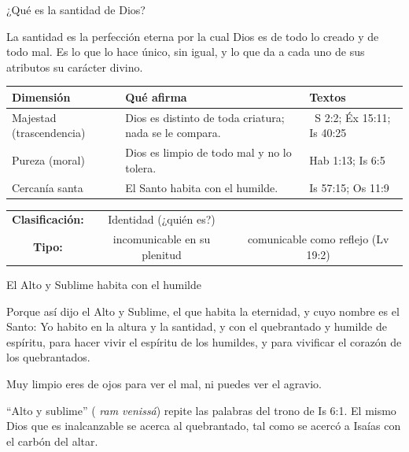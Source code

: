 \begin{frame}{¿Qué es la santidad de Dios?}
\begin{tcolorbox}[colback=papiro,colframe=azul,boxrule=1pt,arc=3pt,fonttitle=\bfseries\small,title=Definición]
\small La santidad es la perfección eterna por la cual Dios es  de todo lo creado y  de todo mal. Es lo que lo hace único, sin igual, y lo que da a cada uno de sus atributos su carácter divino.
\end{tcolorbox}
\scriptsize\renewcommand{\arraystretch}{1.25}
\begin{tabular}{@{}>{\RaggedRight\arraybackslash}p{2.6cm}>{\RaggedRight\arraybackslash}p{5.0cm}>{\RaggedRight\arraybackslash}p{4.0cm}@{}}
\toprule
\textbf{Dimensión} & \textbf{Qué afirma} & \textbf{Textos} \\ \midrule
Majestad (trascendencia) & Dios es distinto de toda criatura; nada se le compara. & 1~S 2:2; Éx 15:11; Is 40:25 \\
Pureza (moral) & Dios es limpio de todo mal y no lo tolera. & Hab 1:13; Is 6:5 \\
Cercanía santa & El Santo habita con el humilde. & Is 57:15; Os 11:9 \\
\bottomrule
\end{tabular}\par\smallskip
\begin{center}\footnotesize
\begin{tabular}{ccc}
\textbf{Clasificación:} & Identidad (¿quién es?) & \\
\textbf{Tipo:} & incomunicable en su plenitud & comunicable como reflejo (Lv 19:2)\\
\end{tabular}
\end{center}
\end{frame}

\begin{frame}{El Alto y Sublime habita con el humilde}
\begin{cita}Porque así dijo el Alto y Sublime, el que habita la eternidad, y cuyo nombre es el Santo: Yo habito en la altura y la santidad, y con el quebrantado y humilde de espíritu, para hacer vivir el espíritu de los humildes, y para vivificar el corazón de los quebrantados.\end{cita}
\begin{cita}Muy limpio eres de ojos para ver el mal, ni puedes ver el agravio.\end{cita}
\small ``Alto y sublime'' ( \emph{ram venissá}) repite las palabras del trono de Is 6:1. El mismo Dios que es inalcanzable se acerca al quebrantado, tal como se acercó a Isaías con el carbón del altar.
\end{frame}

